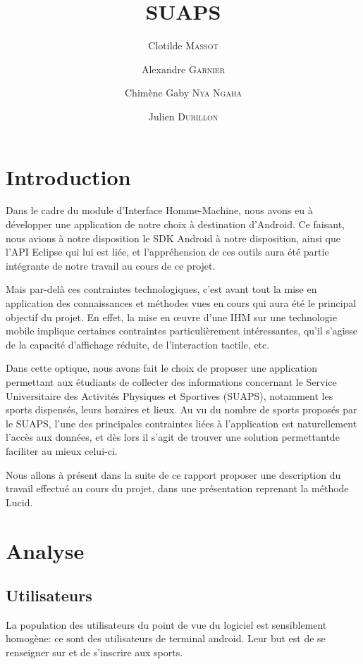 \documentclass{article}
\title{SUAPS}
\author{Clotilde \textsc{Massot} \and Alexandre \textsc{Garnier} \and Chimène Gaby \textsc{Nya Ngaha} \and Julien \textsc{Durillon}}
\begin{document}
\maketitle

\section*{Introduction}

Dans le cadre du module d'Interface Homme-Machine, nous avons eu à développer
une application de notre choix à destination d'Android.
Ce faisant, nous avions à notre disposition le SDK Android à notre disposition,
ainsi que l'API Eclipse qui lui est liée, et l'appréhension de ces outils aura
été  partie intégrante de notre travail au cours de ce projet.

Mais par-delà ces contraintes technologiques, c'est avant tout la mise en
application des connaissances et méthodes vues en cours qui aura été le
principal objectif du projet.
En effet, la mise en œuvre d'une IHM sur une technologie mobile implique
certaines contraintes particulièrement intéressantes, qu'il s'agisse de la
capacité d'affichage réduite, de l'interaction tactile, etc.

Dans cette optique, nous avons fait le choix de proposer une application
permettant aux étudiants de collecter des informations concernant le Service
Universitaire des Activités Physiques et Sportives (SUAPS), notamment les sports
dispensés, leurs horaires et lieux.
Au vu du nombre de sports proposés par le SUAPS, l'une des principales
contraintes liées à l'application est naturellement l'accès aux données, et dès
lors il s'agit de trouver une solution permettantde faciliter au mieux celui-ci.

Nous allons à présent dans la suite de ce rapport proposer une description du
travail effectué au cours du projet, dans une présentation reprenant la méthode
Lucid.

\section{Analyse}
\label{sec:analyse}

	\subsection{Utilisateurs}
		La population des utilisateurs du point de vue du logiciel est
		sensiblement homogène: ce sont des utilisateurs de terminal android.
		Leur but est de se renseigner sur et de s'inscrire aux sports.
\end{document}
